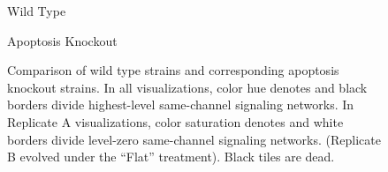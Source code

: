 \begin{figure}[!htbp]
\begin{center}
\vspace{1.0ex}

\hspace*{\fill}%
\begin{minipage}[t]{0.05\columnwidth}
\vspace{0pt} %
\end{minipage}%
\hfill
\begin{minipage}[t]{0.45\columnwidth}
\centering
\vspace{0pt} %
Wild Type
\end{minipage}%
\hfill
\begin{minipage}[t]{0.45\columnwidth}
\centering
\vspace{0pt} %
Apoptosis Knockout
\end{minipage}%
\hspace*{\fill}

\caption{
Comparison of wild type strains and corresponding apoptosis knockout strains.
In all visualizations, color hue denotes and black borders divide highest-level same-channel signaling networks.
In Replicate A visualizations, color saturation denotes and white borders divide level-zero same-channel signaling networks.
(Replicate B evolved under the ``Flat'' treatment).
Black tiles are dead.
}
\label{fig:ko-apoptosis}
\end{center}
\end{figure}
